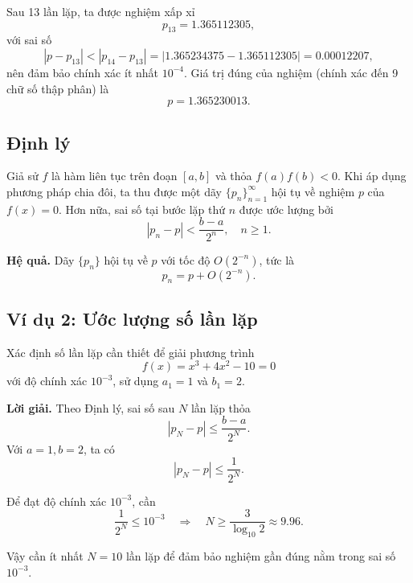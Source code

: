 Sau 13 lần lặp, ta được nghiệm xấp xỉ
\[
p_{13} = 1.365112305,
\]
với sai số
\[
|p - p_{13}| < |p_{14} - p_{13}| = |1.365234375 - 1.365112305| = 0.00012207,
\]
nên đảm bảo chính xác ít nhất $10^{-4}$.  
Giá trị đúng của nghiệm (chính xác đến 9 chữ số thập phân) là
\[
p = 1.365230013.
\]

\subsection*{\textbf{Định lý}}

Giả sử $f$ là hàm liên tục trên đoạn $[a,b]$ và thỏa $f(a)f(b) < 0$.  
Khi áp dụng phương pháp chia đôi, ta thu được một dãy $\{p_n\}_{n=1}^\infty$ hội tụ về nghiệm $p$ của $f(x)=0$.  
Hơn nữa, sai số tại bước lặp thứ $n$ được ước lượng bởi
\[
|p_n - p| < \frac{b-a}{2^n}, \quad n \geq 1.
\]

\textbf{Hệ quả.}  
Dãy $\{p_n\}$ hội tụ về $p$ với tốc độ $O(2^{-n})$, tức là
\[
p_n = p + O(2^{-n}).
\]

\subsection*{\textbf{Ví dụ 2: Ước lượng số lần lặp}}

Xác định số lần lặp cần thiết để giải phương trình
\[
f(x) = x^3 + 4x^2 - 10 = 0
\]
với độ chính xác $10^{-3}$, sử dụng $a_1 = 1$ và $b_1 = 2$.

\textbf{Lời giải.}  
Theo Định lý, sai số sau $N$ lần lặp thỏa
\[
|p_N - p| \leq \frac{b-a}{2^N}.
\]
Với $a=1, b=2$, ta có
\[
|p_N - p| \leq \frac{1}{2^N}.
\]

Để đạt độ chính xác $10^{-3}$, cần
\[
\frac{1}{2^N} \leq 10^{-3}
\quad \Rightarrow \quad
N \geq \frac{3}{\log_{10} 2} \approx 9.96.
\]

Vậy cần ít nhất $N=10$ lần lặp để đảm bảo nghiệm gần đúng nằm trong sai số $10^{-3}$.


